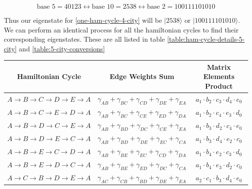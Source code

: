 \documentclass[msc,oneside]{ubcthesis}
\begin{document}
	\begin{equation*}
		\text{base } 5 = 40123 \leftrightarrow \text{base } 10 = 2538 \leftrightarrow  \text{base } 2 = 100111101010
	\end{equation*}
	
	Thus our eigenstate for \ref{one-ham-cycle-4-city} will be  $|2538\rangle$ or $|100111101010\rangle$. We can perform an identical process for all the hamiltonian cycles to find their corresponding eigenstates. These are all listed in table \ref{table:ham-cycle-details-5-city} and \ref{table:5-city-conversions}
	
	
	
	
	\begin{table}[h]
		\centering
		\begin{tabular}{|c|c|c|}
			\hline
			\textbf{Hamiltonian Cycle} & \textbf{Edge Weights Sum} & \textbf{Matrix Elements Product} \\
			\hline
$A \rightarrow B \rightarrow C \rightarrow D \rightarrow E \rightarrow A$ & $ \gamma_{AB} + \gamma_{BC} + \gamma_{CD} + \gamma_{DE} + \gamma_{EA}$ & $a_1  \cdot b_2 \cdot c_3 \cdot d_4 \cdot e_0$ \\
$A \rightarrow B \rightarrow C \rightarrow E \rightarrow D \rightarrow A$ & $ \gamma_{AB} + \gamma_{BC} + \gamma_{CE} + \gamma_{ED} + \gamma_{DA}$ & $a_1  \cdot b_2 \cdot c_4 \cdot e_3 \cdot d_0$ \\
$A \rightarrow B \rightarrow D \rightarrow C \rightarrow E \rightarrow A$ & $ \gamma_{AB} + \gamma_{BD} + \gamma_{DC} + \gamma_{CE} + \gamma_{EA}$ & $a_1  \cdot b_3 \cdot d_2 \cdot c_4 \cdot e_0$ \\
$A \rightarrow B \rightarrow D \rightarrow E \rightarrow C \rightarrow A$ & $ \gamma_{AB} + \gamma_{BD} + \gamma_{DE} + \gamma_{EC} + \gamma_{CA}$ & $a_1  \cdot b_3 \cdot d_4 \cdot e_2 \cdot c_0$ \\
$A \rightarrow B \rightarrow E \rightarrow C \rightarrow D \rightarrow A$ & $ \gamma_{AB} + \gamma_{BE} + \gamma_{EC} + \gamma_{CD} + \gamma_{DA}$ & $a_1  \cdot b_4 \cdot e_2 \cdot c_3 \cdot d_0$ \\
$A \rightarrow B \rightarrow E \rightarrow D \rightarrow C \rightarrow A$ & $ \gamma_{AB} + \gamma_{BE} + \gamma_{ED} + \gamma_{DC} + \gamma_{CA}$ & $a_1  \cdot b_4 \cdot e_3 \cdot d_2 \cdot c_0$ \\
$A \rightarrow C \rightarrow B \rightarrow D \rightarrow E \rightarrow A$ & $ \gamma_{AC} + \gamma_{CB} + \gamma_{BD} + \gamma_{DE} + \gamma_{EA}$ & $a_2  \cdot c_1 \cdot b_3 \cdot d_4 \cdot e_0$ \\

\end{tabular}
\end{table}
\end{document}

